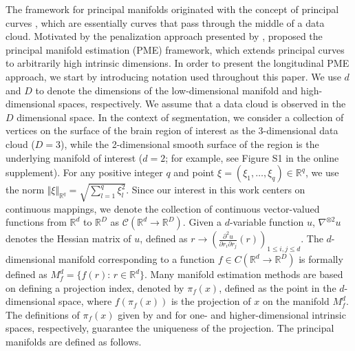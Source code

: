 \documentclass[12pt]{article}
\theoremstyle{definition}
\begin{document}
The framework for principal manifolds originated with the concept of principal curves \citep{hastiePrincipalCurves1989}, which are essentially curves that pass through the middle of a data cloud. Motivated by the penalization approach presented by \cite{smolaRegularizedPrincipalManifolds2001}, \cite{mengPrincipalManifoldEstimation2021} proposed the principal manifold estimation (PME) framework, which extends principal curves to arbitrarily high intrinsic dimensions. In order to present the longitudinal PME approach, we start by introducing notation used throughout this paper. We use $d$ and $D$ to denote the dimensions of the low-dimensional manifold and high-dimensional spaces, respectively. We assume that a data cloud is observed in the $D$ dimensional space. In the context of segmentation, we consider a collection of vertices on the surface of the brain region of interest as the 3-dimensional data cloud ($D=3$), while the 2-dimensional smooth surface of the region is the underlying manifold of interest ($d=2$; for example, see Figure S1 in the online supplement). For any positive integer $q$ and point $\xi=(\xi_1,\ldots,\xi_q)\in\mathbb{R}^q$, we use the norm $\Vert \xi\Vert_{\mathbb{R}^q}=\sqrt{\sum_{l=1}^q \xi_l^2}$. Since our interest in this work centers on continuous mappings, we denote the collection of continuous vector-valued functions from $\mathbb{R}^d$ to $\mathbb{R}^D$ as $\mathcal{C}(\mathbb{R}^{d} \to \mathbb{R}^{D})$. Given a $d$-variable function $u$, $\nabla^{\otimes 2} u$ denotes the Hessian matrix of $u$, defined as $r \to \left( \frac{\partial ^2 u}{\partial r_i \partial r_j}(r) \right)_{1 \leq i, j \leq d}$. The $d$-dimensional manifold corresponding to a function $f \in C(\mathbb{R}^{d} \to \mathbb{R}^{D})$ is formally defined as $M_f^d=\{f(r):\,r\in\mathbb{R}^d\}$. Many manifold estimation methods are based on defining a projection index, denoted by $\pi_f(x)$, defined as the point in the $d$-dimensional space, where $f(\pi_f(x))$ is the projection of $x$ on the manifold $M_f^d$. The definitions of $\pi_f(x)$ given by \cite{hastiePrincipalCurves1989} and \cite{mengPrincipalManifoldEstimation2021} for one- and higher-dimensional intrinsic spaces, respectively, guarantee the uniqueness of the projection. The principal manifolds are defined as follows.
\end{document}

